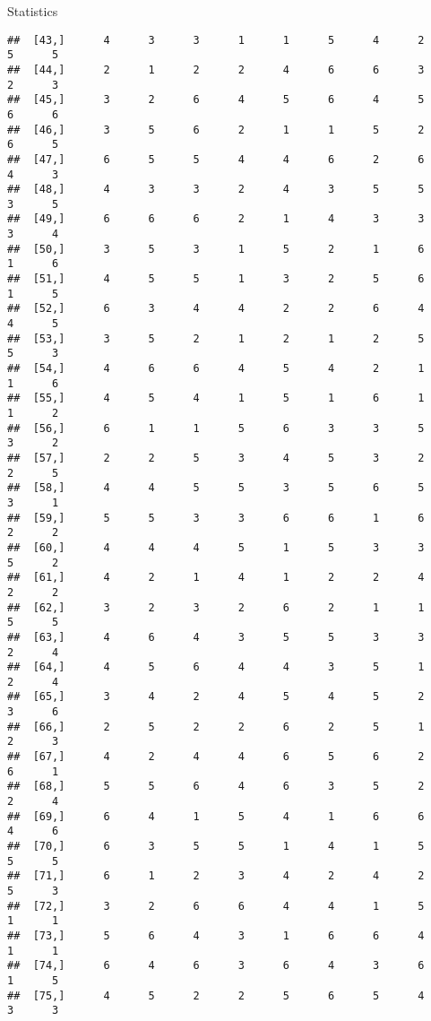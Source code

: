 \documentclass[
  ignorenonframetext,
]{beamer}
\begin{document}
\begin{frame}[fragile]{Statistics}
\begin{verbatim}
##  [43,]      4      3      3      1      1      5      4      2      5      5
##  [44,]      2      1      2      2      4      6      6      3      2      3
##  [45,]      3      2      6      4      5      6      4      5      6      6
##  [46,]      3      5      6      2      1      1      5      2      6      5
##  [47,]      6      5      5      4      4      6      2      6      4      3
##  [48,]      4      3      3      2      4      3      5      5      3      5
##  [49,]      6      6      6      2      1      4      3      3      3      4
##  [50,]      3      5      3      1      5      2      1      6      1      6
##  [51,]      4      5      5      1      3      2      5      6      1      5
##  [52,]      6      3      4      4      2      2      6      4      4      5
##  [53,]      3      5      2      1      2      1      2      5      5      3
##  [54,]      4      6      6      4      5      4      2      1      1      6
##  [55,]      4      5      4      1      5      1      6      1      1      2
##  [56,]      6      1      1      5      6      3      3      5      3      2
##  [57,]      2      2      5      3      4      5      3      2      2      5
##  [58,]      4      4      5      5      3      5      6      5      3      1
##  [59,]      5      5      3      3      6      6      1      6      2      2
##  [60,]      4      4      4      5      1      5      3      3      5      2
##  [61,]      4      2      1      4      1      2      2      4      2      2
##  [62,]      3      2      3      2      6      2      1      1      5      5
##  [63,]      4      6      4      3      5      5      3      3      2      4
##  [64,]      4      5      6      4      4      3      5      1      2      4
##  [65,]      3      4      2      4      5      4      5      2      3      6
##  [66,]      2      5      2      2      6      2      5      1      2      3
##  [67,]      4      2      4      4      6      5      6      2      6      1
##  [68,]      5      5      6      4      6      3      5      2      2      4
##  [69,]      6      4      1      5      4      1      6      6      4      6
##  [70,]      6      3      5      5      1      4      1      5      5      5
##  [71,]      6      1      2      3      4      2      4      2      5      3
##  [72,]      3      2      6      6      4      4      1      5      1      1
##  [73,]      5      6      4      3      1      6      6      4      1      1
##  [74,]      6      4      6      3      6      4      3      6      1      5
##  [75,]      4      5      2      2      5      6      5      4      3      3

\end{verbatim}
\end{frame}
\end{document}

